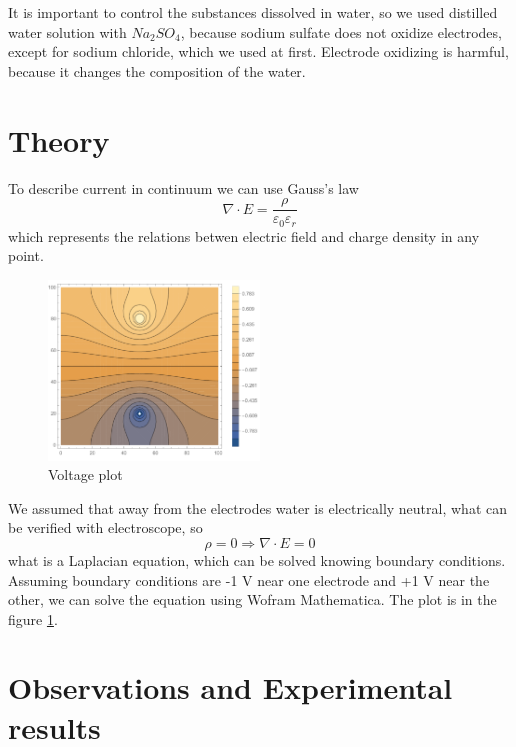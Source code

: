\documentclass{article}
\begin{document}
It is important to control the substances dissolved in water, so we used distilled water solution with $Na_2SO_4$, because sodium sulfate does not oxidize electrodes, except for sodium chloride, which we used at first. Electrode oxidizing is harmful, because it changes the composition of the water.\par

\section{Theory}


To describe current in continuum we can use Gauss's law $$\nabla\cdot E = \frac{\rho}{\varepsilon_0 \varepsilon_r}$$ which represents the relations betwen electric field and charge density in any point.\par

\begin{figure}[h]
    \centering
    \includegraphics[width=0.5\textwidth]{theory plot.pdf}
    \caption{Voltage plot}
    \label{fig:mesh3}
\end{figure}

We assumed that away from the electrodes water is electrically neutral, what can be verified with electroscope, so $$\rho = 0 \Rightarrow \nabla \cdot E = 0$$ what is a Laplacian equation, which can be solved knowing boundary conditions. Assuming boundary conditions are -1 V near one electrode and +1 V near the other, we can solve the equation using Wofram Mathematica. The plot is in the figure \ref{fig:mesh3}. \par



\section{Observations and Experimental results}
\end{document}
